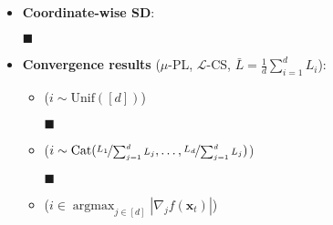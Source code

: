 \documentclass[a4paper]{article}
\DeclareMathOperator*{\argmax}{argmax}
\renewcommand{\vec}[1]{\mathbf{#1}}
\newcommand{\proofsquare}{$\blacksquare$}
\newenvironment{topic}[1]
{\textbf{\sffamily \colorbox{black}{\rlap{\textbf{\textcolor{white}{#1}}}\hspace{\linewidth}\hspace{-2\fboxsep}}} \\ \vspace{0.2cm}}
{}
\begin{document}
\begin{multicols*}{2}
    \begin{topic}{Coordinate descent}
        \begin{itemize}
            \item \textbf{Coordinate-wise SD}:
            \item[\proofsquare]
            \item \textbf{Convergence results} ($\mu$-PL, $\mathcal{L}$-CS, $\bar{L} = \frac{1}{d} \sum_{i=1}^{d} L_i$):
                  \begin{itemize}
                      \item ($i \sim \mathrm{Unif}([d])$)
                      \item[\proofsquare]
                      \item ($i \sim \mathrm{Cat}(\nicefrac{L_1}{\sum_{j=1}^{d} L_j}, \ldots, \nicefrac{L_d}{\sum_{j=1}^{d} L_j})$)
                      \item[\proofsquare]
                      \item ($i \in \argmax_{j\in[d]} |\nabla_j f(\vec{x}_t)|$)
                  \end{itemize}
        \end{itemize}
    \end{topic}


\end{multicols*}
\end{document}
